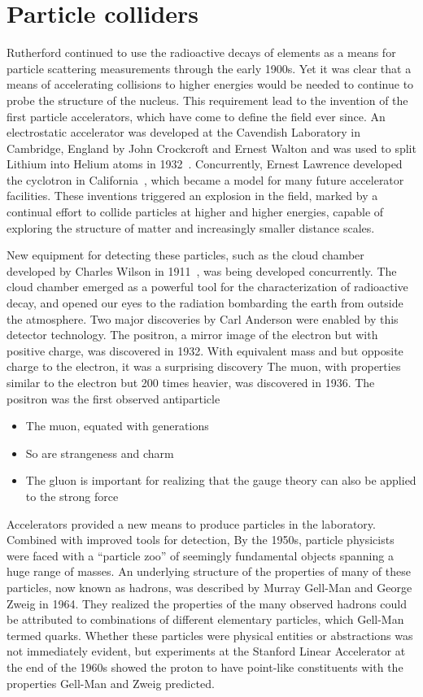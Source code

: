 \section{Particle colliders}
Rutherford continued to use the radioactive decays of elements as a means
for particle scattering measurements through the early 1900s. Yet it was clear that
a means of accelerating collisions to higher energies would be needed
to continue to probe the structure of the nucleus.
This requirement lead to the invention of
the first particle accelerators, which have come to define the field ever since.
An electrostatic accelerator was developed at the Cavendish Laboratory
in Cambridge, England by John Crockcroft and Ernest Walton and
was used to split Lithium into Helium atoms in 1932~\cite{CrockcroftWalton}.
Concurrently, Ernest Lawrence developed the cyclotron in California~\cite{PhysRev.40.19},
which became a model for many future accelerator facilities.
These inventions triggered an explosion in the field, marked by a continual 
effort to collide particles at higher and higher energies, capable of exploring
the structure of matter and increasingly smaller distance scales.

New equipment for detecting these particles,
such as the cloud chamber developed by Charles Wilson
in 1911~\cite{doi:10.1098/rspa.1912.0081}, 
was being developed concurrently. The cloud chamber emerged as a powerful
tool for the characterization of radioactive decay, 
and opened our eyes to the radiation bombarding the earth from
outside the atmosphere. Two major discoveries by Carl Anderson
were enabled by this detector technology. The
positron, a mirror image of the electron but with positive charge, 
was discovered in 1932.
With equivalent mass and but opposite charge to the electron,
it was a surprising discovery
The muon, with properties similar to the electron but 200 times heavier, 
was discovered in 1936. 
The positron was the first observed antiparticle

\begin{itemize}
  \item The muon, equated with generations
  \item So are strangeness and charm
  \item The gluon is important for realizing that the gauge theory can also be applied to the strong force
\end{itemize}

Accelerators provided a new means to produce particles in the laboratory.
Combined with improved tools for detection, 
By the 1950s, particle physicists were faced with a ``particle zoo''
of seemingly fundamental objects spanning a huge range of masses. 
An underlying structure of the properties of many of these particles, 
now known as hadrons, was described by Murray Gell-Man and George Zweig in 1964.
They realized the properties of the many observed hadrons could be 
attributed to combinations of different elementary particles,
which Gell-Man termed quarks.
Whether these particles were physical entities or abstractions was 
not immediately evident, but experiments at the Stanford Linear Accelerator
at the end of the 1960s showed the proton to have point-like constituents
with the properties Gell-Man and Zweig predicted.

